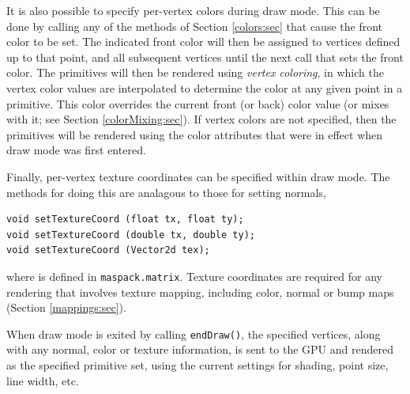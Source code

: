 It is also possible to specify per-vertex colors during draw mode.
This can be done by calling any
of the methods of Section \ref{colors:sec} that cause the front color
to be set. The indicated front color will then be assigned to vertices
defined up to that point, and all subsequent vertices until the next
call that sets the front color. The primitives will then be rendered
using {\it vertex coloring}, in which the vertex color values are
interpolated to determine the color at any given point in a primitive.
This color overrides the current front (or back) color value (or mixes
with it; see Section \ref{colorMixing:sec}).  If vertex colors are not
specified, then the primitives will be rendered using the color
attributes that were in effect when draw mode was first entered.

Finally, per-vertex texture coordinates can be specified within draw
mode. The methods for doing this are analagous to those for setting
normals,
%
\begin{lstlisting}[]
void setTextureCoord (float tx, float ty);
void setTextureCoord (double tx, double ty);
void setTextureCoord (Vector2d tex);
\end{lstlisting}
%
where 
 is defined in {\tt maspack.matrix}.
Texture coordinates are required for any rendering that involves
texture mapping, including color, normal or bump maps (Section
\ref{mappings:sec}).

When draw mode is exited by calling {\tt endDraw()}, the specified
vertices, along with any normal, color or texture information, is sent
to the GPU and rendered as the specified primitive set, using the
current settings for shading, point size, line width, etc.

